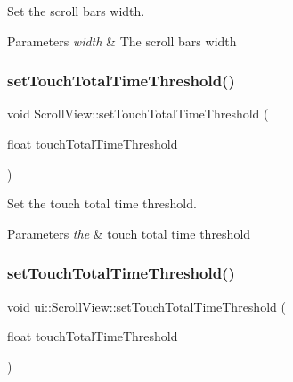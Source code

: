 Set the scroll bar\textquotesingle{}s width. 


\begin{DoxyParams}{Parameters}
{\em width} & The scroll bar\textquotesingle{}s width \\
\hline
\end{DoxyParams}
\mbox{\label{classui_1_1ScrollView_acf1cbcd7c4983d3b97c81dc89c95fe98}} 
\subsubsection{\texorpdfstring{set\+Touch\+Total\+Time\+Threshold()}{setTouchTotalTimeThreshold()}\hspace{0.1cm}{\footnotesize\ttfamily [1/2]}}
{\footnotesize\ttfamily void Scroll\+View\+::set\+Touch\+Total\+Time\+Threshold (\begin{DoxyParamCaption}\item[{float}]{touch\+Total\+Time\+Threshold }\end{DoxyParamCaption})}



Set the touch total time threshold. 


\begin{DoxyParams}{Parameters}
{\em the} & touch total time threshold \\
\hline
\end{DoxyParams}
\mbox{\label{classui_1_1ScrollView_a3edbf2bec7e58e40cbde16437d8ee927}} 
\subsubsection{\texorpdfstring{set\+Touch\+Total\+Time\+Threshold()}{setTouchTotalTimeThreshold()}\hspace{0.1cm}{\footnotesize\ttfamily [2/2]}}
{\footnotesize\ttfamily void ui\+::\+Scroll\+View\+::set\+Touch\+Total\+Time\+Threshold (\begin{DoxyParamCaption}\item[{float}]{touch\+Total\+Time\+Threshold }\end{DoxyParamCaption})}



